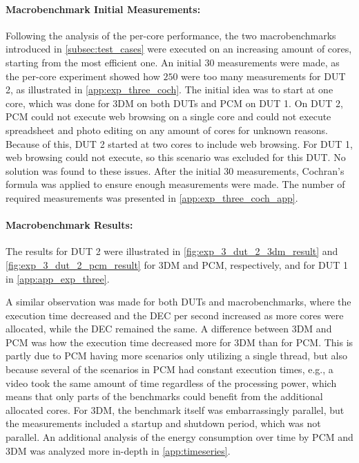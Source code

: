 \paragraph*{Macrobenchmark Initial Measurements:} Following the analysis of the per-core performance, the two macrobenchmarks introduced in \cref{subsec:test_cases} were executed on an increasing amount of cores, starting from the most efficient one. An initial $30$ measurements were made, as the per-core experiment showed how $250$ were too many measurements for DUT 2, as illustrated in \cref{app:exp_three_coch}. The initial idea was to start at one core, which was done for 3DM on both DUTs and PCM on DUT 1. On DUT 2, PCM could not execute web browsing on a single core and could not execute spreadsheet and photo editing on any amount of cores for unknown reasons. Because of this, DUT 2 started at two cores to include web browsing. For DUT 1, web browsing could not execute, so this scenario was excluded for this DUT. No solution was found to these issues. After the initial $30$ measurements, Cochran's formula was applied to ensure enough measurements were made. The number of required measurements was presented in \cref{app:exp_three_coch_app}.



\paragraph*{Macrobenchmark Results:} The results for DUT 2 were illustrated in \cref{fig:exp_3_dut_2_3dm_result} and \cref{fig:exp_3_dut_2_pcm_result} for 3DM and PCM, respectively, and for DUT 1 in \cref{app:app_exp_three}.

A similar observation was made for both DUTs and macrobenchmarks, where the execution time decreased and the DEC per second increased as more cores were allocated, while the DEC remained the same. A difference between 3DM and PCM was how the execution time decreased more for 3DM than for PCM. This is partly due to PCM having more scenarios only utilizing a single thread, but also because several of the scenarios in PCM had constant execution times, e.g., a video took the same amount of time regardless of the processing power, which means that only parts of the benchmarks could benefit from the additional allocated cores. For 3DM, the benchmark itself was embarrassingly parallel, but the measurements included a startup and shutdown period, which was not parallel. An additional analysis of the energy consumption over time by PCM and 3DM was analyzed more in-depth in \cref{app:timeseries}.



